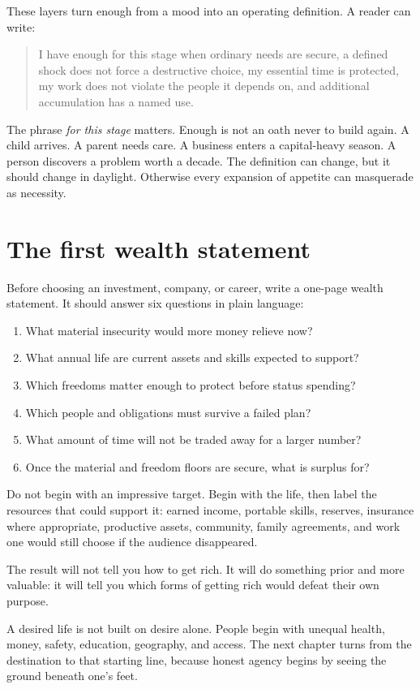 These layers turn enough from a mood into an operating definition. A reader can
write:

\begin{quote}
\small
I have enough for this stage when ordinary needs are secure, a defined shock
does not force a destructive choice, my essential time is protected, my work
does not violate the people it depends on, and additional accumulation has a
named use.
\end{quote}

The phrase \emph{for this stage} matters. Enough is not an oath never to build
again. A child arrives. A parent needs care. A business enters a capital-heavy
season. A person discovers a problem worth a decade. The definition can change,
but it should change in daylight. Otherwise every expansion of appetite can
masquerade as necessity.

\section{The first wealth statement}

Before choosing an investment, company, or career, write a one-page wealth
statement. It should answer six questions in plain language:

\begin{enumerate}
\item What material insecurity would more money relieve now?
\item What annual life are current assets and skills expected to support?
\item Which freedoms matter enough to protect before status spending?
\item Which people and obligations must survive a failed plan?
\item What amount of time will not be traded away for a larger number?
\item Once the material and freedom floors are secure, what is surplus for?
\end{enumerate}

Do not begin with an impressive target. Begin with the life, then label the
resources that could support it: earned income, portable skills, reserves,
insurance where appropriate, productive assets, community, family agreements,
and work one would still choose if the audience disappeared.

The result will not tell you how to get rich. It will do something prior and
more valuable: it will tell you which forms of getting rich would defeat their
own purpose.

A desired life is not built on desire alone. People begin with unequal health,
money, safety, education, geography, and access. The next chapter turns from the
destination to that starting line, because honest agency begins by seeing the
ground beneath one's feet.
